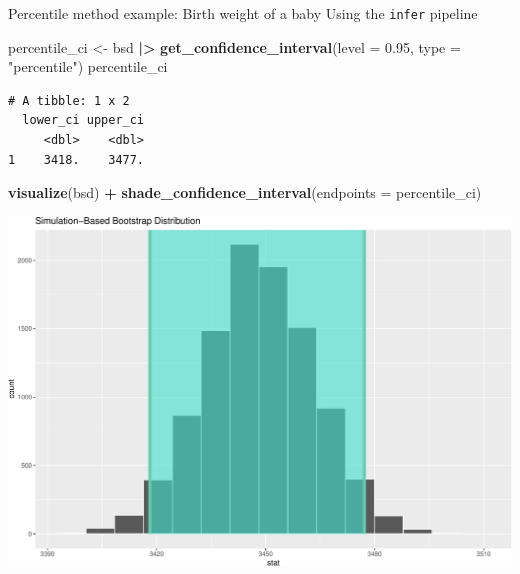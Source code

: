 \documentclass[
  ignorenonframetext,
]{beamer}
\newenvironment{Shaded}{\begin{snugshade}}{\end{snugshade}}
\newcommand{\AttributeTok}[1]{\textcolor[rgb]{0.13,0.29,0.53}{#1}}
\newcommand{\FloatTok}[1]{\textcolor[rgb]{0.00,0.00,0.81}{#1}}
\newcommand{\FunctionTok}[1]{\textcolor[rgb]{0.13,0.29,0.53}{\textbf{#1}}}
\newcommand{\NormalTok}[1]{#1}
\newcommand{\OtherTok}[1]{\textcolor[rgb]{0.56,0.35,0.01}{#1}}
\newcommand{\SpecialCharTok}[1]{\textcolor[rgb]{0.81,0.36,0.00}{\textbf{#1}}}
\newcommand{\StringTok}[1]{\textcolor[rgb]{0.31,0.60,0.02}{#1}}
\begin{document}
\begin{frame}[fragile]{Percentile method example: Birth weight of a
baby}
\protect\hypertarget{percentile-method-example-birth-weight-of-a-baby-1}{}
Using the \texttt{infer} pipeline

\tiny

\begin{Shaded}
\begin{Highlighting}[]
\NormalTok{percentile\_ci }\OtherTok{\textless{}{-}}\NormalTok{ bsd }\SpecialCharTok{|\textgreater{}} 
  \FunctionTok{get\_confidence\_interval}\NormalTok{(}\AttributeTok{level =} \FloatTok{0.95}\NormalTok{, }\AttributeTok{type =} \StringTok{"percentile"}\NormalTok{)}
\NormalTok{percentile\_ci}
\end{Highlighting}
\end{Shaded}

\begin{verbatim}
# A tibble: 1 x 2
  lower_ci upper_ci
     <dbl>    <dbl>
1    3418.    3477.
\end{verbatim}

\begin{Shaded}
\begin{Highlighting}[]
\FunctionTok{visualize}\NormalTok{(bsd) }\SpecialCharTok{+} 
  \FunctionTok{shade\_confidence\_interval}\NormalTok{(}\AttributeTok{endpoints =}\NormalTok{ percentile\_ci)}
\end{Highlighting}
\end{Shaded}

\begin{center}\includegraphics[width=0.7\linewidth,height=0.45\textheight]{Week10_Lect_files/figure-beamer/unnamed-chunk-20-1} \end{center}
\normalsize
\end{frame}
\end{document}
